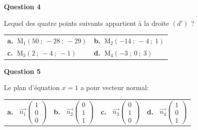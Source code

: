 \documentclass[10pt]{article}
\providecommand{\vect}[1]{\overrightarrow{#1}}
\begin{document}
\medskip

\textbf{Question 4}

Lequel des quatre points suivants appartient à la droite $\left(d'\right)$ ?

\begin{center}
\begin{tabularx}{\linewidth}{*{2}{X}}
\textbf{a.~}M$_1(50~;~-28~;~-29)$&\textbf{b.~}M$_2(-14~;~-4~;~1)$\\
\textbf{c.~}M$_3(2~;~-4~;~-1)$& \textbf{d.~}M$_4 (-3~;~0~;~3)$
\end{tabularx}
\end{center}

\medskip

\textbf{Question 5}

Le plan d'équation $x = 1$ a pour vecteur normal:

\begin{center}
\begin{tabularx}{\linewidth}{*{4}{X}}
\textbf{a.~} $\vect{n_1}\begin{pmatrix}1\\0\\0\end{pmatrix}$&
\textbf{b.~} $\vect{n_2}\begin{pmatrix}0\\1\\1\end{pmatrix}$&
\textbf{c.~} $\vect{n_3}\begin{pmatrix}0\\1\\0\end{pmatrix}$&
\textbf{d.~} $\vect{n_4}\begin{pmatrix}1\\0\\1\end{pmatrix}$
\end{tabularx}
\end{center}
\end{document}
